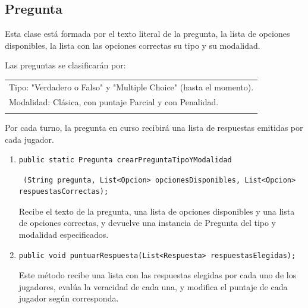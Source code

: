 \documentclass[titlepage,a4paper]{article}
\begin{document}
\subsection{Pregunta}
Esta clase está formada por el texto literal de la pregunta, la lista de opciones disponibles, la lista con las opciones correctas su tipo y su modalidad.

Las preguntas se clasificarán por:\\

\begin{tabular}{l}
Tipo: "Verdadero o Falso"$ $ y "Multiple Choice" $ $(hasta el momento).\\
Modalidad: Clásica, con puntaje Parcial y con Penalidad.\\\\
\end{tabular}

Por cada turno, la pregunta en curso recibirá una lista de respuestas emitidas por cada jugador. \\

\begin{enumerate}
\item \begin{verbatim}public static Pregunta crearPreguntaTipoYModalidad\end{verbatim} \begin{verbatim} (String pregunta, List<Opcion> opcionesDisponibles, List<Opcion> respuestasCorrectas);\end{verbatim}
 Recibe el texto de la pregunta, una lista de opciones disponibles y una lista de opciones correctas, y devuelve una instancia de Pregunta del tipo y modalidad especificados.
\item \begin{verbatim}
public void puntuarRespuesta(List<Respuesta> respuestasElegidas);\end{verbatim}
Este método recibe una lista con las respuestas elegidas por cada uno de los jugadores, evalúa la veracidad de cada una, y modifica el puntaje de cada jugador según corresponda.
\end{enumerate}
\end{document}
